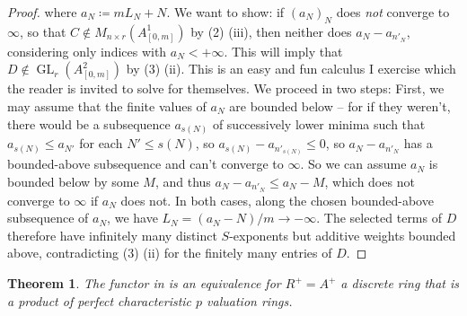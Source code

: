 \documentclass[10pt,twoside]{article}
\numberwithin{equation}{section}
\theoremstyle{plain}
\newtheorem{mythm}{Theorem}[section]
\theoremstyle{definition}
\DeclareMathOperator{\GL}{GL}
\begin{document}
\begin{proof}
        where \(a_N\coloneqq mL_N+N\). We want to show: if \((a_N)_N\) does \emph{not} converge to \(\infty\), so that \(C\notin M_{n\times r}(A^1_{[0,m]})\) by  (2) (iii), then neither does \(a_N-a_{n'_N}\), considering only indices with \(a_N<+\infty\). This will imply that \(D\notin\GL_r(A^2_{[0,m]})\) by  (3) (ii). This is an easy and fun calculus I exercise which the reader is invited to solve for themselves. We proceed in two steps: First, we may assume that the finite values of \(a_N\) are bounded below -- for if they weren't, there would be a subsequence \(a_{s(N)}\) of successively lower minima such that \(a_{s(N)}\leq a_{N'}\) for each \(N'\leq s(N)\), so \(a_{s(N)}-a_{n'_{s(N)}}\leq 0\), so \(a_N-a_{n'_N}\) has a bounded-above subsequence and can't converge to \(\infty\). So we can assume \(a_N\) is bounded below by some \(M\), and thus \(a_N-a_{n'_N}\leq a_N-M\), which does not converge to \(\infty\) if \(a_N\) does not. In both cases, along the chosen bounded-above subsequence of \(a_N\), we have \(L_N=(a_N-N)/m\to-\infty\). The selected terms of \(D\) therefore have infinitely many distinct \(S\)-exponents but additive weights bounded above, contradicting (3) (ii) for the finitely many entries of \(D\).
\end{proof}

\begin{mythm}\label{mainThmDiscrete}
The functor in  is an equivalence for \(R^+=A^+\) a discrete ring that is a product of perfect characteristic \(p\) valuation rings.
\end{mythm}
\end{document}
